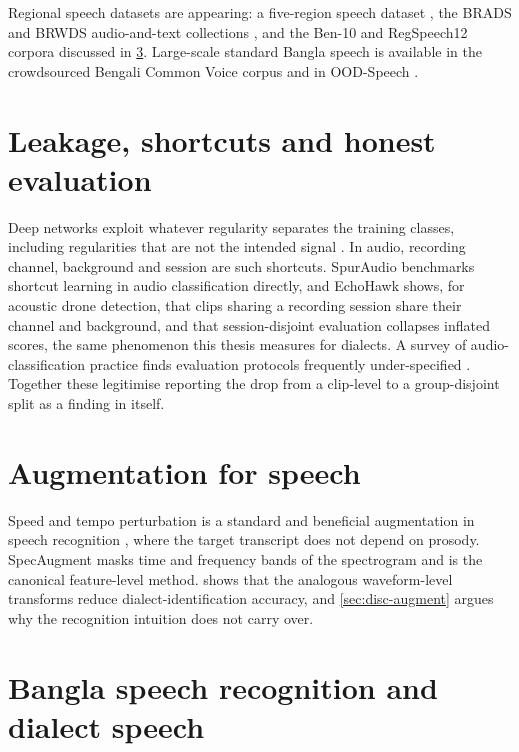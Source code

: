 Regional speech datasets are appearing: a five-region speech dataset
\cite{Rahman2026Bangla}, the BRADS and BRWDS audio-and-text collections
\cite{Aiman2025BRADS}, and the Ben-10 and RegSpeech12 corpora discussed in
\cref{sec:bg-asr}. Large-scale standard Bangla speech is available in the
crowdsourced Bengali Common Voice corpus \cite{Alam2022Bengali} and in
OOD-Speech \cite{Rakib2023OODSpeech}.

\section{Leakage, shortcuts and honest evaluation}
\label{sec:bg-leakage}

Deep networks exploit whatever regularity separates the training classes,
including regularities that are not the intended signal
\cite{Geirhos2020Shortcut}. In audio, recording channel, background and session
are such shortcuts. SpurAudio \cite{AbuAyoub2026SpurAudio} benchmarks shortcut learning
in audio classification directly, and EchoHawk \cite{Shulman2026EchoHawk} shows, for
acoustic drone detection, that clips sharing a recording session share their
channel and background, and that session-disjoint evaluation collapses inflated
scores, the same phenomenon this thesis measures for dialects. A survey of
audio-classification practice finds evaluation protocols frequently
under-specified \cite{Puvanendran2025Benchmarking}. Together these legitimise reporting the
drop from a clip-level to a group-disjoint split as a finding in itself.

\section{Augmentation for speech}
\label{sec:bg-aug}

Speed and tempo perturbation is a standard and beneficial augmentation in speech
recognition \cite{Ko2015Audio}, where the target transcript does not
depend on prosody. SpecAugment \cite{Park2019SpecAugment} masks time and
frequency bands of the spectrogram and is the canonical feature-level method.
 shows that the analogous waveform-level transforms reduce
dialect-identification accuracy, and \cref{sec:disc-augment} argues why the
recognition intuition does not carry over.

\section{Bangla speech recognition and dialect speech}
\label{sec:bg-asr}


